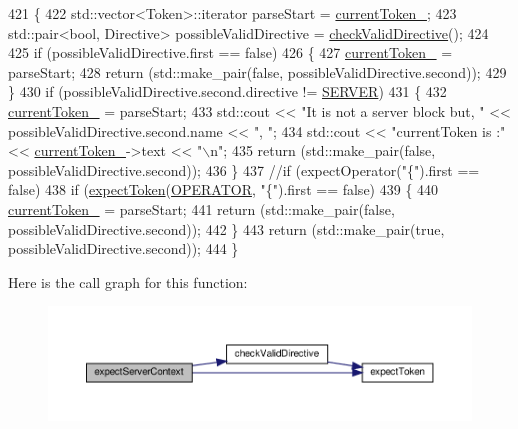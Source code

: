 \begin{DoxyCode}
421     \{
422         std::vector<Token>::iterator parseStart = \hyperlink{classft_1_1_parser_a942c5b794d108f144c5b5028aaa34cb6}{currentToken\_};
423         std::pair<bool, Directive> possibleValidDirective = \hyperlink{classft_1_1_parser_ad48298d21629daf7c9a31e101bf322ba}{checkValidDirective}();
424 
425         \textcolor{keywordflow}{if} (possibleValidDirective.first == \textcolor{keyword}{false}) 
426         \{
427             \hyperlink{classft_1_1_parser_a942c5b794d108f144c5b5028aaa34cb6}{currentToken\_} = parseStart;
428             \textcolor{keywordflow}{return} (std::make\_pair(\textcolor{keyword}{false}, possibleValidDirective.second));
429         \}
430         \textcolor{keywordflow}{if} (possibleValidDirective.second.directive != \hyperlink{namespaceft_a5a5554dff10f0dc50bae4cc5825ad75da67c96b24b23bcb408bae7626730a04b7}{SERVER})
431         \{
432             \hyperlink{classft_1_1_parser_a942c5b794d108f144c5b5028aaa34cb6}{currentToken\_} = parseStart;
433             std::cout << \textcolor{stringliteral}{"It is not a server block but, "} << possibleValidDirective.second.name << \textcolor{stringliteral}{", "};
434             std::cout << \textcolor{stringliteral}{"currentToken is :"} << \hyperlink{classft_1_1_parser_a942c5b794d108f144c5b5028aaa34cb6}{currentToken\_}->text << \textcolor{stringliteral}{"\(\backslash\)n"};
435             \textcolor{keywordflow}{return} (std::make\_pair(\textcolor{keyword}{false}, possibleValidDirective.second));
436         \}
437         \textcolor{comment}{//if (expectOperator("\{").first == false)}
438         \textcolor{keywordflow}{if} (\hyperlink{classft_1_1_parser_a1615a752d3642bb53598e2c8db810db0}{expectToken}(\hyperlink{namespaceft_aa520fbf142ba1e7e659590c07da31921a6411d9d6073252e4d316493506bbb979}{OPERATOR}, \textcolor{stringliteral}{"\{"}).first == \textcolor{keyword}{false})
439         \{
440             \hyperlink{classft_1_1_parser_a942c5b794d108f144c5b5028aaa34cb6}{currentToken\_} = parseStart;
441             \textcolor{keywordflow}{return} (std::make\_pair(\textcolor{keyword}{false}, possibleValidDirective.second));
442         \}
443         \textcolor{keywordflow}{return} (std::make\_pair(\textcolor{keyword}{true}, possibleValidDirective.second));
444     \}
\end{DoxyCode}
Here is the call graph for this function\+:
\nopagebreak
\begin{figure}[H]
\begin{center}
\leavevmode
\includegraphics[width=350pt]{classft_1_1_parser_a72f108d920a35284bf8f740bb8240acd_cgraph}
\end{center}
\end{figure}
